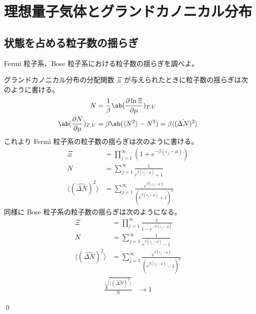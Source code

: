 \documentclass[uplatex,dvipdfmx,a4paper,11pt]{jlreq}
\makeatletter
\numberwithin{equation}{section}
\theoremstyle{definition}
\renewenvironment{proof}[1][\proofname]{\par
  \normalfont
  \topsep6\p@\@plus6\p@ \trivlist
  \item[\hskip\labelsep{\bfseries #1}\@addpunct{\bfseries}]\ignorespaces\quad\par
}{%
  \qed\endtrivlist\@endpefalse
}
\renewcommand\proofname{証明}
\makeatother
\begin{document}
\section{理想量子気体とグランドカノニカル分布}
\setcounter{subsection}{5}
\subsection{状態を占める粒子数の揺らぎ}
\begin{problem}
Fermi 粒子系、Bose 粒子系における粒子数の揺らぎを調べよ。
\end{problem}
\begin{proof}
  グランドカノニカル分布の分配関数 $\Xi$ が与えられたときに粒子数の揺らぎは次のように書ける。
  \begin{align}
    N                         & = \frac{1}{\beta}\ab(\diffp{\ln\Xi}{\mu})_{T,V}                              \\
    \ab(\diffp{N}{\mu})_{T,V} & = \beta\ab(\langle N^2\rangle - N^2) = \beta\langle(\hat{\Delta N})^2\rangle
  \end{align}
  これより Fermi 粒子系の粒子数の揺らぎは次のように書ける。
  \begin{align}
    \Xi                              & = \prod_{j=1}^{\infty}(1 + e^{-\beta(\varepsilon_j - \mu)})                                        \\
    N                                & = \sum_{j=1}^{\infty}\frac{1}{e^{\beta(\varepsilon_j - \mu)} + 1}                                  \\
    \langle(\hat{\Delta N})^2\rangle & = \sum_{j=1}^{\infty}\frac{e^{\beta(\varepsilon_j - \mu)}}{(e^{\beta(\varepsilon_j - \mu)} + 1)^2}
  \end{align}
  同様に Bose 粒子系の粒子数の揺らぎは次のようになる。
  \begin{align}
    \Xi                              & = \prod_{j=1}^{\infty}\frac{1}{1 - e^{-\beta(\varepsilon_j - \mu)}}                                \\
    N                                & = \sum_{j=1}^{\infty}\frac{1}{e^{\beta(\varepsilon_j - \mu)} - 1}                                  \\
    \langle(\hat{\Delta N})^2\rangle & = \sum_{j=1}^{\infty}\frac{e^{\beta(\varepsilon_j - \mu)}}{(e^{\beta(\varepsilon_j - \mu)} - 1)^2}
  \end{align}
  \begin{align}
    \frac{\sqrt{\langle(\hat{\Delta N})^2\rangle}}{N} & \to 1
  \end{align}

\end{proof}
\end{document}
